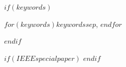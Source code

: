 \documentclass[conference,$if(fontsize)$$fontsize$,$endif$$if(draftmode)$$draftmode$,$endif$$if(papersize)$$papersize$,$endif$$for(classoption)$$classoption$$sep$,$endfor$]{IEEEtran}
\begin{document}
%








\maketitle

\begin{abstract}
$abstract$
\end{abstract}

$if(keywords)$
\begin{IEEEkeywords}
$for(keywords)$$keywords$$sep$, $endfor$
\end{IEEEkeywords}
$endif$


$if(IEEEspecialpaper)$
$endif$


\maketitle


%
\IEEEpeerreviewmaketitle
\end{document}
